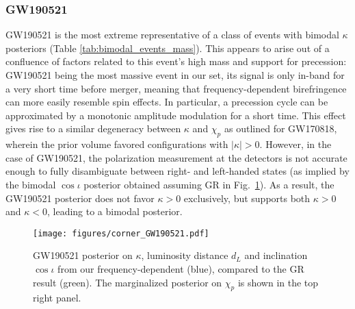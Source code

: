 \documentclass[aps,prd,twocolumn,superscriptaddress,preprintnumbers,floatfix,nofootinbib]{revtex4-2}
\begin{document}
\subsubsection{GW190521}
\label{sec:GW190521}

GW190521 is the most extreme representative of a class of events with bimodal $\kappa$ posteriors (Table \ref{tab:bimodal_events_mass}).
This appears to arise out of a confluence of factors related to this event's high mass and support for precession: GW190521 being the most massive event in our set, its signal is only in-band for a very short time before merger, meaning that frequency-dependent birefringence can more easily resemble spin effects.
In particular, a precession cycle can be approximated by a monotonic amplitude modulation for a short time.
This effect gives rise to a similar degeneracy between $\kappa$ and $\chi_p$ as outlined for GW170818, wherein the prior volume favored configurations with $|\kappa| >0$.
However, in the case of GW190521, the polarization measurement at the detectors is not accurate enough to fully disambiguate between right- and left-handed states (as implied by the bimodal $\cos\iota$ posterior obtained assuming \ac{GR} in Fig.~\ref{fig:corner_GW190521}).
As a result, the GW190521 posterior does not favor $\kappa > 0$ exclusively, but supports both $\kappa > 0$ and $\kappa < 0$, leading to a bimodal posterior.

\begin{figure}[h]
    \texttt{[image: figures/corner\_GW190521.pdf]}
    \caption{
        GW190521 posterior on $\kappa$, luminosity distance $d_L$ and inclination $\cos\iota$ from our frequency-dependent (blue), compared to the GR result (green).
        The marginalized posterior on $\chi_p$ is shown in the top right panel.
    }
    \label{fig:corner_GW190521}
\end{figure}
\end{document}
